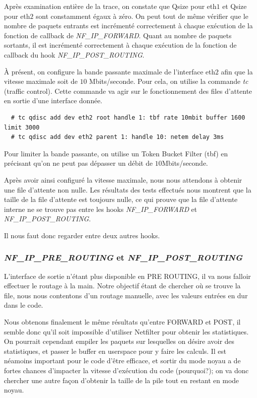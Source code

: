 \documentclass[a4paper]{article}
\begin{document}
Après examination entière de la trace, on constate que Qsize
pour eth$1$ et Qsize pour eth$2$ sont constamment égaux à zéro.
On peut tout de même vérifier que le nombre de paquets entrants
est incrémenté correctement à chaque exécution de la fonction
de callback de \textit{NF\_IP\_FORWARD}. Quant au nombre de paquets
sortants, il est incrémenté correctement à chaque exécution de la
fonction de callback du hook \textit{NF\_IP\_POST\_ROUTING}.

À présent, on configure la bande passante maximale de l'interface
eth$2$ afin que la vitesse maximale soit de $10$ Mbits/seconde.
Pour cela, on utilise la commande \textit{tc} (traffic control).
Cette commande va agir sur le fonctionnement des files d’attente
en sortie d’une interface donnée.
\begin{verbatim}
  # tc qdisc add dev eth2 root handle 1: tbf rate 10mbit buffer 1600 limit 3000
  # tc qdisc add dev eth2 parent 1: handle 10: netem delay 3ms
\end{verbatim}
Pour limiter la bande passante, on utilise un Token Bucket Filter
(tbf) en précisant qu’on ne peut pas dépasser un débit de
$10$Mbits/seconde.

Après avoir ainsi configuré la vitesse maximale,
nous nous attendons à obtenir une file d’attente non nulle.
Les résultats des tests effectués nous montrent que la taille
de la file d’attente est toujours nulle, ce qui prouve que la
file d’attente interne ne se trouve pas entre les hooks
\textit{NF\_IP\_FORWARD} et \textit{NF\_IP\_POST\_ROUTING}.

Il nous faut donc regarder entre deux autres hooks.

\subsubsection{\textit{NF\_IP\_PRE\_ROUTING} et \textit{NF\_IP\_POST\_ROUTING}}
L'interface de sortie n'étant plus disponible en PRE ROUTING,
il va nous falloir effectuer le routage à la main. Notre
objectif étant de chercher où se trouve la file, nous nous
contentons d'un routage manuelle, avec les valeurs entrées en
dur dans le code.

Nous obtenons finalement le même résultats qu'entre FORWARD et POST,
il semble donc qu'il soit impossible d'utiliser Netfilter pour
obtenir les statistiques. On pourrait cependant empiler les paquets
sur lesquelles on désire avoir des statistiques, et passer le
buffer en userspace pour y faire les calculs. Il est néamoins
important pour le code d'être efficace, et sortir du mode noyau
a de fortes chances d'impacter la vitesse d'exécution du code
(pourquoi?); on va donc chercher une autre façon d'obtenir
la taille de la pile tout en restant en mode noyau.
\end{document}
